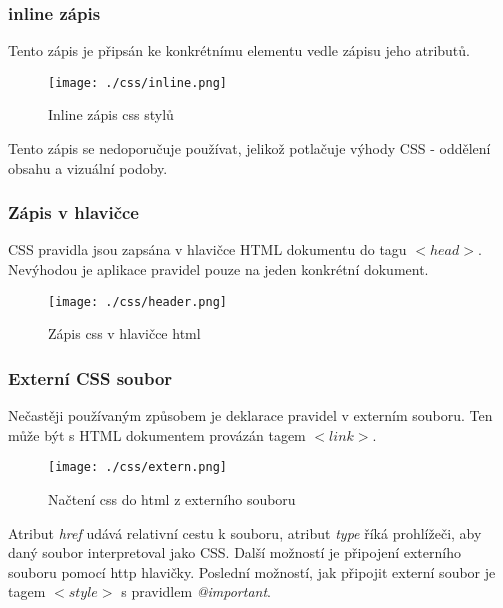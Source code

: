 \documentclass[main.tex]{subfiles}
\begin{document}
\subsubsection{inline zápis}
Tento zápis je připsán ke konkrétnímu elementu vedle zápisu jeho atributů.
		\begin{figure}[h]
			\centering
			\texttt{[image: ./css/inline.png]}
			\caption{Inline zápis css stylů}
		\end{figure}
Tento zápis se nedoporučuje používat, jelikož potlačuje výhody CSS - oddělení obsahu a vizuální podoby.

\subsubsection{Zápis v hlavičce}
CSS pravidla jsou zapsána v hlavičce HTML dokumentu do tagu $<head>$. Nevýhodou je aplikace pravidel pouze na jeden konkrétní dokument.
		\begin{figure}[h]
			\centering
			\texttt{[image: ./css/header.png]}
			\caption{Zápis css v hlavičce html}
		\end{figure}
\subsubsection{Externí CSS soubor}
Nečastěji používaným způsobem je deklarace pravidel v externím souboru. Ten může být s HTML dokumentem provázán tagem \textit{$<link>$}.
		\begin{figure}[h]
			\centering
			\texttt{[image: ./css/extern.png]}
			\caption{Načtení css do html z externího souboru }
		\end{figure}
Atribut \textit{href} udává relativní cestu k souboru, atribut \textit{type} říká prohlížeči, aby daný soubor interpretoval jako CSS. 
Další možností je připojení externího souboru pomocí http hlavičky.
Poslední možností, jak připojit externí soubor je tagem \textit{$<style>$} s pravidlem \textit{@important}.




\end{document}
